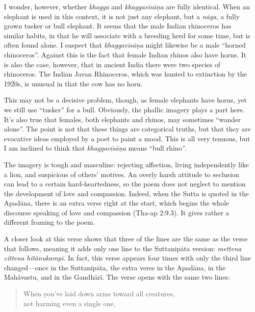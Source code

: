 \documentclass[12pt,openany]{book}%
\begin{document}
I wonder, however, whether \textit{khagga} and \textit{\textsanskrit{khaggavisāṇa}} are fully identical. When an elephant is used in this context, it is not just any elephant, but a \textit{\textsanskrit{nāga}}, a fully grown tusker or bull elephant. It seems that the male Indian rhinoceros has similar habits, in that he will associate with a breeding herd for some time, but is often found alone. I suspect that \textit{\textsanskrit{khaggavisāṇa}} might likewise be a male “horned rhinoceros”. Against this is the fact that female Indian rhinos also have horns. It is also the case, however, that in ancient India there were two species of rhinoceros. The Indian Javan Rhinoceros, which was hunted to extinction by the 1920s, is unusual in that the cow has no horn.

This may not be a decisive problem, though, as female elephants have horns, yet we still use “tusker” for a bull. Obviously, the phallic imagery plays a part here. It’s also true that females, both elephants and rhinos, may sometimes “wander alone”. The point is not that these things are categorical truths, but that they are evocative ideas employed by a poet to paint a mood. This is all very tenuous, but I am inclined to think that \textit{\textsanskrit{khaggavisāṇa}} means “bull rhino”.

The imagery is tough and masculine: rejecting affection, living independently like a lion, and suspicious of others’ motives. An overly harsh attitude to seclusion can lead to a certain hard-heartedness, so the poem does not neglect to mention the development of love and compassion. Indeed, when the Sutta is quoted in the \textsanskrit{Apadāna}, there is an extra verse right at the start, which begins the whole discourse speaking of love and compassion (Tha-ap 2:9.3). It gives rather a different framing to the poem.

A closer look at this verse shows that three of the lines are the same as the verse that follows, meaning it adds only one line to the \textsanskrit{Suttanipāta} version: \textit{mettena cittena \textsanskrit{hitānukampī}}. In fact, this verse appears four times with only the third line changed—once in the \textsanskrit{Suttanipāta}, the extra verse in the \textsanskrit{Apadāna}, in the \textsanskrit{Mahāvastu}, and in the \textsanskrit{Gandhārī}. The verse opens with the same two lines:

\begin{verse}%
When you’ve laid down arms toward all creatures, \\
not harming even a single one,

%
\end{verse}
\end{document}
